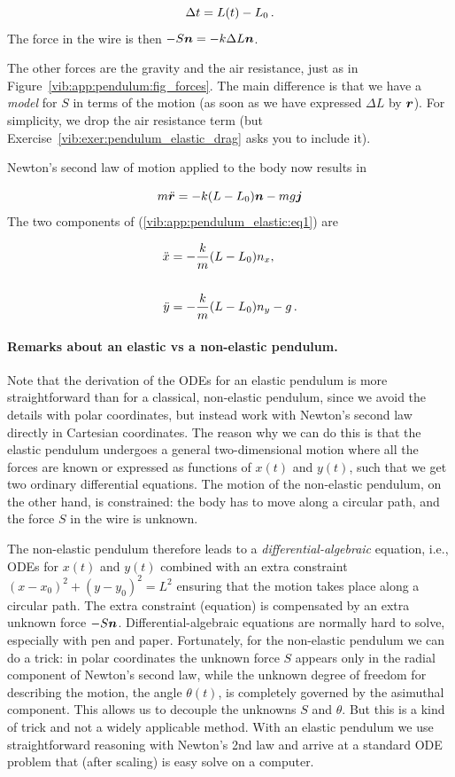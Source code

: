 \documentclass[%
oneside,                 %
final,                   %
10pt]{article}
\begin{document}
\[ \Delta t = L(t) - L_0\tp\]
The force in the wire is then $-S\normalvec=-k\Delta L\normalvec$.

The other forces are the gravity and the air resistance, just
as in Figure~\ref{vib:app:pendulum:fig_forces}. The main difference
is that we have a \emph{model} for $S$ in terms of the motion (as soon as
we have expressed $\Delta L$ by $\rpos$). For simplicity, we drop
the air resistance term (but Exercise~\ref{vib:exer:pendulum_elastic_drag}
asks you to include it).

Newton's second law of motion applied to the body now results in

\begin{equation}
m\ddot\rpos = -k(L-L_0)\normalvec - mg\jj
\label{vib:app:pendulum_elastic:eq1}
\end{equation}
The two components of
(\ref{vib:app:pendulum_elastic:eq1}) are

\begin{align}
\ddot x &= -\frac{k}{m}(L-L_0)n_x,\\ 
\label{vib:app:pendulum_elastic:eq2a} \\ 
\ddot y &= - \frac{k}{m}(L-L_0)n_y - g
\label{vib:app:pendulum_elastic:eq2b}\tp
\end{align}

\paragraph{Remarks about an elastic vs a non-elastic pendulum.}
Note that the derivation of the ODEs for an elastic pendulum is more
straightforward than for a classical, non-elastic pendulum,
since we avoid the details
with polar coordinates, but instead work with Newton's second law
directly in Cartesian coordinates. The reason why we can do this is that
the elastic pendulum undergoes a general two-dimensional motion where
all the forces are known or expressed as functions of $x(t)$ and $y(t)$,
such that we get two ordinary differential equations.
The motion of the non-elastic pendulum, on the other hand, is constrained:
the body has to move along a circular path, and the force $S$ in the
wire is unknown.

The non-elastic pendulum therefore leads to
a \emph{differential-algebraic} equation, i.e., ODEs for $x(t)$ and $y(t)$
combined with an extra constraint $(x-x_0)^2 + (y-y_0)^2 = L^2$
ensuring that the motion takes place along a circular path.
The extra constraint (equation) is compensated by an extra unknown force
$-S\normalvec$. Differential-algebraic equations are normally hard
to solve, especially with pen and paper.
Fortunately, for the non-elastic pendulum we can do a
trick: in polar coordinates the unknown force $S$ appears only in the
radial component of Newton's second law, while the unknown
degree of freedom for describing the motion, the angle $\theta(t)$,
is completely governed by the asimuthal component. This allows us to
decouple the unknowns $S$ and $\theta$. But this is a kind of trick and
not a widely applicable method. With an elastic pendulum we use straightforward
reasoning with Newton's 2nd law and arrive at a standard ODE problem that
(after scaling) is easy solve on a computer.
\end{document}

